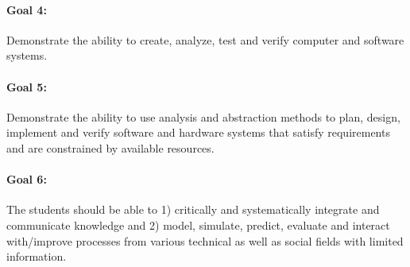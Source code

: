 \paragraph{Goal 4:} Demonstrate the ability to create, analyze,
test and verify computer and software systems.


% 
% 
% 
% 
% 

\paragraph{Goal 5:} Demonstrate the ability to use analysis and
abstraction methods to plan, design, implement and verify software and
hardware systems that satisfy requirements and are constrained by
available resources.

% 
% 
% 
% 

\paragraph{Goal 6:} The students should be able to
%
1) critically and systematically integrate and communicate knowledge
and 
%
2) model, simulate, predict, evaluate and interact with/improve
processes from various technical as well as social fields with limited
information.

